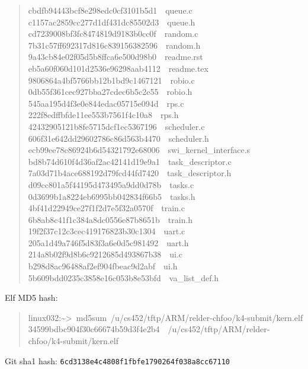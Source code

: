 \documentclass[letterpaper]{article}
\begin{document}
\begin{quote}
{cbdfb94443bcf8e298edc0cf3101b5d1~~queue.c\\
c1157ac2859cc277d1df431dc85502d3~~queue.h\\
cd7239008bf3fc8474819d9183b0cc0f~~random.c\\
7b31c57ff692317d816c839156382596~~random.h\\
9a43cb84e02f05d5b8ffca6e500d98b0~~readme.rst\\
eb5a60f060d101d2536e96298aab4112~~readme.tex\\
9806864a4bf5766bb12b1bd9c1467121~~robio.c\\
0db55f361cec927bba27cdec6b5c2e55~~robio.h\\
545aa195d4f3e0e844edac05715e094d~~rps.c\\
222f8edffbfde11ee553b7561f4c10a8~~rps.h\\
42432905121b8fe5715dcf1ec5367196~~scheduler.c\\
606f31e642dd29602786c86d563b4470~~scheduler.h\\
ecb99ee78c86924b6d54321792e68006~~swi\_kernel\_interface.s\\
bd8b74d610f4d36af2ac42141d19e9a1~~task\_descriptor.c\\
7a03d71b4ace688192d79fcd44fd7420~~task\_descriptor.h\\
d09cc801a5f44195d473495a9dd0d78b~~tasks.c\\
0d3699b1a8224eb6995bb042834f66b5~~tasks.h\\
4bf41d22949ce27f1f2d7e5f32a0570f~~train.c\\
6b8ab8c41f1c384a8dc0556e87b8651b~~train.h\\
19f2f37c12c3cec419176823b30c1304~~uart.c\\
205a1d49a746f5d83f3a6e0d5c981492~~uart.h\\
214a8b02f9d8b6c9212685d493867b38~~ui.c\\
b298d8ac96488af2ef904fbeac9d2abf~~ui.h\\
5b609bdd0235c3858e16c053b8e53bfd~~va\_list\_def.h
}
\end{quote}

Elf MD5 hash:
%
\begin{quote}{\ttfamily \raggedright \noindent
linux032:\textasciitilde{}>~md5sum~/u/cs452/tftp/ARM/relder-chfoo/k4-submit/kern.elf\\
34599bdbc904f30c66674b59d3f4e2b4~~/u/cs452/tftp/ARM/relder-chfoo/k4-submit/kern.elf
}
\end{quote}

Git sha1 hash: \texttt{6cd3138e4c4808f1fbfe1790264f038a8cc67110}
\end{document}

